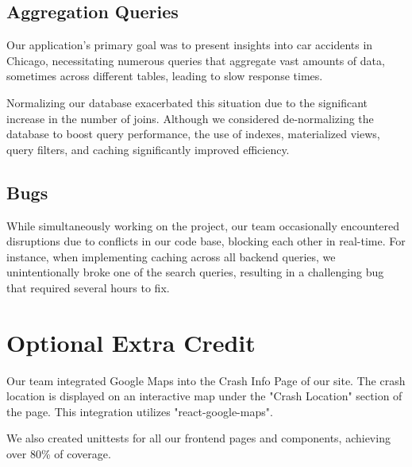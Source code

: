 \documentclass[12pt]{article}
\begin{document}
\subsection{Aggregation Queries}

Our application's primary goal was to present insights into car accidents in Chicago, necessitating numerous queries that aggregate vast amounts of data, sometimes across different tables, leading to slow response times. 

Normalizing our database exacerbated this situation due to the significant increase in the number of joins. Although we considered de-normalizing the database to boost query performance, the use of indexes, materialized views, query filters, and caching significantly improved efficiency.


\subsection{Bugs}

While simultaneously working on the project, our team occasionally encountered disruptions due to conflicts in our code base, blocking each other in real-time. For instance, when implementing caching across all backend queries, we unintentionally broke one of the search queries, resulting in a challenging bug that required several hours to fix.


\section{Optional Extra Credit}
Our team integrated Google Maps into the Crash Info Page of our site. The crash location is displayed on an interactive map under the "Crash Location" section of the page. This integration utilizes "react-google-maps".

We also created unittests for all our frontend pages and components, achieving over 80\% of coverage.
\end{document}
